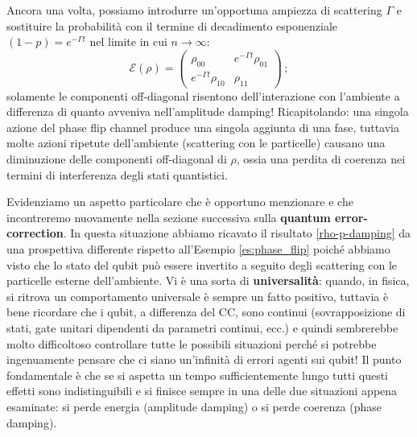 Ancora una volta, possiamo introdurre un'opportuna ampiezza di scattering $\Gamma$ e sostituire la probabilità con il termine di decadimento esponenziale $(1-p)=e^{-\Gamma t}$ nel limite in cui $n \to \infty$:
\begin{equation}\label{rho_final_phase_damping}
    \mathcal{E}(\rho) = \begin{pmatrix}
                            \rho_{00} & e^{-\Gamma t}\rho_{01} \\
                            e^{-\Gamma t}\rho_{10} & \rho_{11}
                        \end{pmatrix} \, ;
\end{equation}
solamente le componenti off-diagonal risentono dell'interazione con l'ambiente a differenza di quanto avveniva nell'amplitude damping! Ricapitolando: una singola azione del phase flip channel produce una singola aggiunta di una fase, tuttavia molte azioni ripetute dell'ambiente (scattering con le particelle) causano una diminuzione delle componenti off-diagonal di $\rho$, ossia una perdita di coerenza nei termini di interferenza degli stati quantistici.

\noindent Evidenziamo un aspetto particolare che è opportuno menzionare e che incontreremo nuovamente nella sezione successiva sulla \textbf{quantum error-correction}. In questa situazione abbiamo ricavato il risultato \eqref{rho-p-damping} da una prospettiva differente rispetto all'Esempio \ref{es:phase_flip} poiché abbiamo visto che lo stato del qubit può essere invertito a seguito degli scattering con le particelle esterne dell'ambiente. Vi è una sorta di \textbf{universalità}: quando, in fisica, si ritrova un comportamento universale è sempre un fatto positivo, tuttavia è bene ricordare che i qubit, a differenza del CC, sono continui (sovrapposizione di stati, gate unitari dipendenti da parametri continui, ecc.) e quindi sembrerebbe molto difficoltoso controllare tutte le possibili situazioni perché si potrebbe ingenuamente pensare che ci siano un'infinità di errori agenti sui qubit! Il punto fondamentale è che se si aspetta un tempo sufficientemente lungo tutti questi effetti sono indistinguibili e si finisce sempre in una delle due situazioni appena esaminate: si perde energia (amplitude damping) o si perde coerenza (phase damping).

